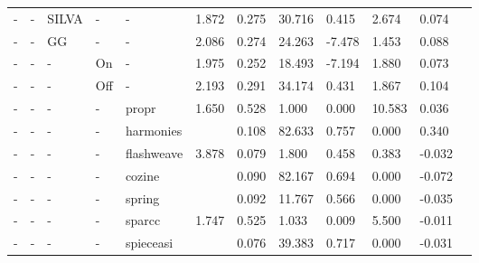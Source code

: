 \begin{landscape}
\begin{table}[H]
\begin{tabular}{|l|p{1cm}|p{1cm}|p{1cm}|p{2cm}|p{1.5cm}|p{1.5cm}|p{1.5cm}|p{1.5cm}|p{1.5cm}|p{1.5cm}|p{1.5cm}|}
-  & -             & SILVA             & -           & -          & 1.872                        & 0.275              & 30.716                      & 0.415      & 2.674             & 0.074                            \\
-  & -             & GG                & -           & -          & 2.086                        & 0.274              & 24.263                      & -7.478     & 1.453             & 0.088                            \\
-  & -             & -                 & On          & -          & 1.975                        & 0.252              & 18.493                      & -7.194     & 1.880             & 0.073                            \\
-  & -             & -                 & Off         & -          & 2.193                        & 0.291              & 34.174                      & 0.431      & 1.867             & 0.104                            \\
-  & -             & -                 & -           & propr      & 1.650                        & 0.528              & 1.000                       & 0.000      & 10.583            & 0.036                            \\
-  & -             & -                 & -           & harmonies  &                              & 0.108              & 82.633                      & 0.757      & 0.000             & 0.340                            \\
-  & -             & -                 & -           & flashweave & 3.878                        & 0.079              & 1.800                       & 0.458      & 0.383             & -0.032                           \\
-  & -             & -                 & -           & cozine     &                              & 0.090              & 82.167                      & 0.694      & 0.000             & -0.072                           \\
-  & -             & -                 & -           & spring     &                              & 0.092              & 11.767                      & 0.566      & 0.000             & -0.035                           \\
-  & -             & -                 & -           & sparcc     & 1.747                        & 0.525              & 1.033                       & 0.009      & 5.500             & -0.011                           \\
-  & -             & -                 & -           & spieceasi  &                              & 0.076              & 39.383                      & 0.717      & 0.000             & -0.031                           \\

\end{tabular}
\end{table}
\end{landscape}
